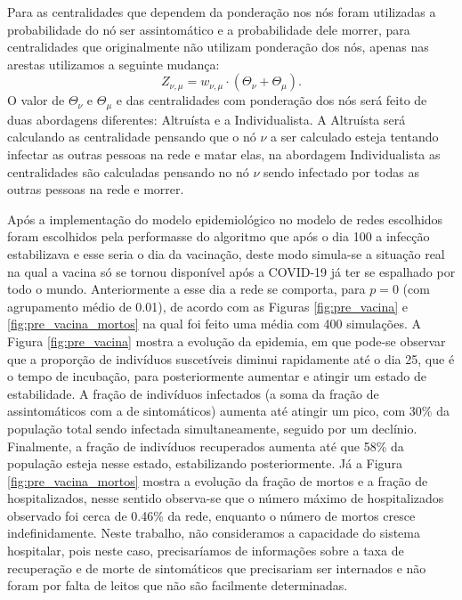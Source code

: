 Para as centralidades que dependem da ponderação nos nós foram utilizadas a probabilidade do nó ser assintomático e a probabilidade dele morrer, para centralidades que originalmente não utilizam ponderação dos nós, apenas nas arestas utilizamos a seguinte mudança:
\begin{equation}
    Z_{\nu,\mu} = w_{\nu,\mu}\cdot(\Theta_\nu + \Theta_\mu).
\end{equation}
O valor de $\Theta_\nu$ e $\Theta_\mu$ e das centralidades com ponderação dos nós será feito de duas abordagens diferentes: Altruísta e a Individualista. A Altruísta será calculando as centralidade pensando que o nó $\nu$ a ser calculado esteja tentando infectar as outras pessoas na rede e matar elas, na abordagem Individualista as centralidades são calculadas pensando no nó $\nu$ sendo infectado por todas as outras pessoas na rede e morrer.

Após a implementação do modelo epidemiológico no modelo de redes escolhidos foram escolhidos pela performasse do algoritmo que após o dia 100 a infecção estabilizava e esse seria o dia da vacinação, deste modo simula-se a situação real na qual a vacina só se tornou disponível após a COVID-19 já ter se espalhado por todo o mundo. Anteriormente a esse dia a rede se comporta, para $p = 0$ (com agrupamento médio de 0.01), de acordo com as Figuras \ref{fig:pre_vacina} e \ref{fig:pre_vacina_mortos} na qual foi feito uma média com 400 simulações. A Figura \ref{fig:pre_vacina} mostra a evolução da epidemia, em que pode-se observar que a proporção de indivíduos suscetíveis diminui rapidamente até o dia 25, que é o tempo de incubação, para posteriormente aumentar e atingir um estado de estabilidade. A fração de indivíduos infectados (a soma da fração de assintomáticos com a de sintomáticos) aumenta até atingir um pico, com  30\% da população total sendo infectada simultaneamente, seguido por um declínio. Finalmente, a fração de indivíduos recuperados aumenta até que 58\% da população esteja nesse estado, estabilizando posteriormente. Já a Figura \ref{fig:pre_vacina_mortos} mostra a evolução  da  fração de mortos e a fração de hospitalizados, nesse sentido observa-se que o número máximo de hospitalizados observado foi cerca de 0.46\% da rede, enquanto o número de mortos cresce indefinidamente. Neste trabalho, não consideramos a capacidade do sistema hospitalar, pois neste caso, precisaríamos de informações sobre a taxa de recuperação e de morte de sintomáticos que precisariam ser internados e não foram por falta de leitos que não são facilmente determinadas.   

